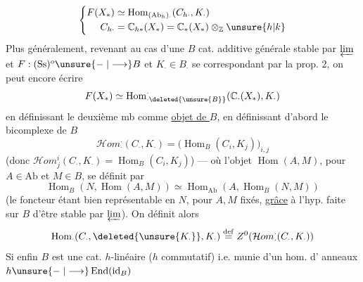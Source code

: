 \[
\left\{\begin{aligned}
F(X_*)&\simeq\operatorname{Hom}_{(\mathrm{Ab}_h)_\cdot}(C_{h\cdot},K_\cdot)\\
C_{h\cdot}&=\mathbb C_{h*}(X_*)=\mathbb C_*(X_*)\otimes_{\mathbb Z}\unsure{h|k}
\end{aligned}\right.
\]
Plus généralement, revenant au cas d'une
$B$ cat. additive générale stable par $\varprojlim$
et $F:(\mathrm{Ss})^o\unsure{\mathrel{-}|\longrightarrow}B$  et $K_\cdot\in B_\cdot$ se correspondant
par la prop. 2, on peut encore
écrire
\[
F(X_*)\simeq\operatorname{Hom}^{\cdot}_{\cdot\deleted{\unsure{B}}}(\mathbb C_\cdot(X_*),K_\cdot)
\]
en définissant le deuxième mb comme
\uline{objet de $B$}, en définissant d'abord le
bicomplexe de $B$
\[
\mathcal Hom^{\cdot}_{\cdot}(C_\cdot,K_\cdot)=
\bigl(\operatorname{Hom}_B(C_i,K_j)\bigr)_{i,j}
\]
(donc $\mathcal Hom^i_j(C_\cdot,K_\cdot)=\operatorname{Hom}_B(C_i,K_j)$)
--- où l'objet $\operatorname{Hom}(A,M)$, pour $A\in\mathrm{Ab}$
et $M\in B$, se définit par
\[
\operatorname{Hom}_B(N,\operatorname{Hom}(A,M))\simeq
\operatorname{Hom}_{\mathrm{Ab}}(A,\operatorname{Hom}_B(N,M))
\]
(le foncteur  étant bien
représentable en $N$, pour $A,M$ fixés, \uline{grâce}
à l'hyp. faite sur $B$ d'être stable par $\varprojlim$).
On définit alors
\[
\operatorname{Hom}_\cdot(C_\cdot,\deleted{\unsure{K_\cdot}},K_\cdot)
\overset{\mathrm{def}}=Z^0(\mathcal Hom^{\cdot}_{\cdot}(C_\cdot,K_\cdot))
\]
Si enfin $B$ est une cat. $h$-linéaire
($h$ commutatif) i.e. munie d'un hom. d'
anneaux $h\unsure{\mathrel{-}|\longrightarrow}\operatorname{End}(\mathrm{id}_B)$

